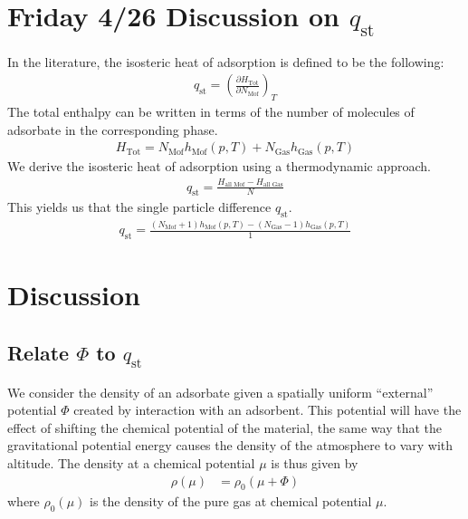 \documentclass[letterpaper,twocolumn,amsmath,amssymb,jcp,aps,10pt]{revtex4-1}
\newcommand\V{\Phi}
\begin{document}
\section{Friday 4/26 Discussion on $q_\text{st}$}
In the literature, the isosteric heat of adsorption is defined to be the following:
\begin{align}
    q_\text{st} = \left(\frac{\partial H_\text{Tot}}{\partial N_\text{Mof}}\right)_T
\end{align}
The total enthalpy can be written in terms of the number of molecules of adsorbate in the corresponding phase.
\begin{align}
    H_\text{Tot} = N_\text{Mof} h_\text{Mof}\left(p,T\right) + N_\text{Gas} h_\text{Gas}\left(p,T\right)
\end{align}
We derive the isosteric heat of adsorption using a thermodynamic approach.
\begin{align}
    q_\text{st} = \frac{H_\text{all Mof} - H_\text{all Gas}}{N}
\end{align}
This yields us that the single particle difference $q_\text{st}$.
\begin{align}
    q_\text{st} = \frac{\left(N_\text{Mof}+1\right) h_\text{Mof}\left(p,T\right) - \left(N_\text{Gas}-1\right) h_\text{Gas}\left(p,T\right)}{1}
\end{align}

\section{Discussion}


\subsection{Relate $\Phi$ to $q_\text{st}$}
We consider the density of an adsorbate given a spatially uniform ``external'' potential $\Phi$ created by
interaction with an adsorbent.  This potential will have the effect of shifting the chemical potential of
the material, the same way that the gravitational potential energy causes the density of the atmosphere to
vary with altitude.  The density at a chemical potential $\mu$ is thus given by
\begin{align}
    \rho(\mu) &= \rho_0(\mu + \V)\label{eq:mof-density}
\end{align}
where $\rho_0(\mu)$ is the density of the pure gas at chemical potential $\mu$.
\end{document}
